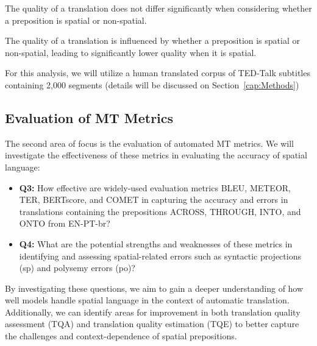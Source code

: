 \begin{hypothesis}
The quality of a translation does not differ significantly when considering whether a preposition is spatial or non-spatial.
\end{hypothesis}


\begin{hypothesis2}
The quality of a translation is influenced by whether a preposition is spatial or non-spatial, leading to significantly lower quality when it is spatial.
\end{hypothesis2}


For this analysis, we will utilize a human translated corpus of TED-Talk subtitles containing 2,000 segments (details will be discussed on Section~\ref{cap:Methods})

\subsection{Evaluation of MT Metrics}
\label{sub:q3-q4}

The second area of focus is the evaluation of automated MT metrics. We will investigate the effectiveness of these metrics in evaluating the accuracy of spatial language:

\begin{itemize}
    \item \textbf{Q3:} How effective are widely-used evaluation metrics BLEU, METEOR, TER, BERTscore, and COMET in capturing the accuracy and errors in translations containing the prepositions ACROSS, THROUGH, INTO, and ONTO from EN-PT-br? \label{Q3}
    \item \textbf{Q4:} What are the potential strengths and weaknesses of these metrics in identifying and assessing spatial-related errors such as syntactic projections (sp) and polysemy errors (po)? \label{Q4}
\end{itemize}

By investigating these questions, we aim to gain a deeper understanding of how well models handle spatial language in the context of automatic translation. Additionally, we can identify areas for improvement in both translation quality assessment (TQA) and translation quality estimation (TQE) to better capture the challenges and context-dependence of spatial prepositions.


